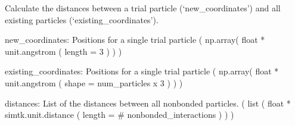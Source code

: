 \documentclass[letterpaper,10pt,english]{sphinxmanual}
\begin{document}

\begin{fulllineitems}
\label{\detokenize{index:utilities.util.non_bonded_distances}}
Calculate the distances between a trial particle (‘new\_coordinates’)
and all existing particles (‘existing\_coordinates’).

new\_coordinates: Positions for a single trial particle
( np.array( float * unit.angstrom ( length = 3 ) ) )

existing\_coordinates: Positions for a single trial particle
( np.array( float * unit.angstrom ( shape = num\_particles x 3 ) ) )

distances: List of the distances between all nonbonded particles.
( list ( float * simtk.unit.distance ( length = \# nonbonded\_interactions ) ) )

\end{fulllineitems}

\end{document}
